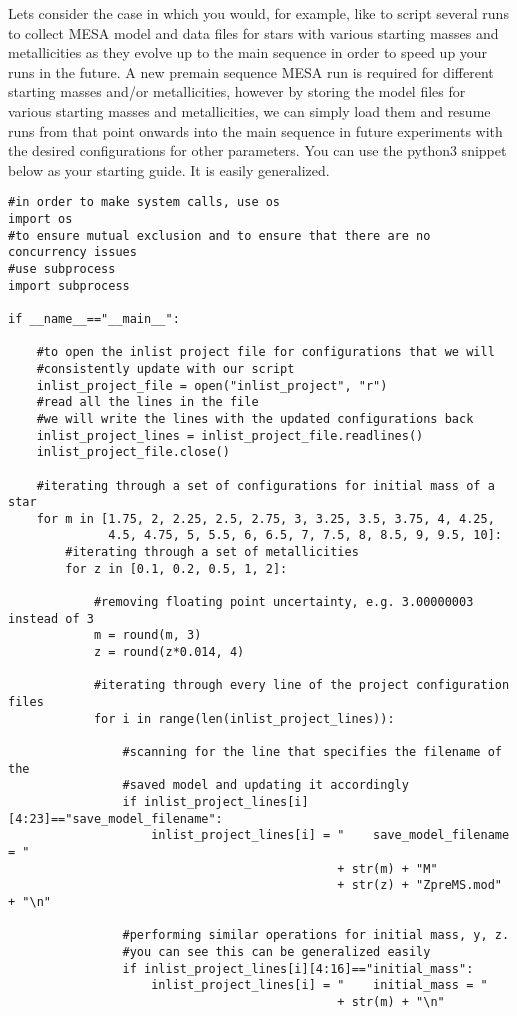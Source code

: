 \documentclass[12pt,hidelinks]{article}
\begin{document}
	    Lets consider the case in which you would, for example, like to script several runs to collect MESA model and data files for stars with various starting masses and metallicities as they evolve up to the main sequence in order to speed up your runs in the future. A new pre\-main sequence MESA run is required for different starting masses and/or metallicities, however by storing the model files for various starting masses and metallicities, we can simply load them and resume runs from that point onwards into the main sequence in future experiments with the desired configurations for other parameters. You can use the python3 snippet below as your starting guide. It is easily generalized.
		\begin{lstlisting}
#in order to make system calls, use os
import os
#to ensure mutual exclusion and to ensure that there are no concurrency issues
#use subprocess
import subprocess

if __name__=="__main__":

    #to open the inlist project file for configurations that we will
    #consistently update with our script
    inlist_project_file = open("inlist_project", "r")
    #read all the lines in the file
    #we will write the lines with the updated configurations back
    inlist_project_lines = inlist_project_file.readlines()
    inlist_project_file.close()

    #iterating through a set of configurations for initial mass of a star
    for m in [1.75, 2, 2.25, 2.5, 2.75, 3, 3.25, 3.5, 3.75, 4, 4.25,
              4.5, 4.75, 5, 5.5, 6, 6.5, 7, 7.5, 8, 8.5, 9, 9.5, 10]:
        #iterating through a set of metallicities
        for z in [0.1, 0.2, 0.5, 1, 2]:

            #removing floating point uncertainty, e.g. 3.00000003 instead of 3
            m = round(m, 3)
            z = round(z*0.014, 4)

            #iterating through every line of the project configuration files
            for i in range(len(inlist_project_lines)):

                #scanning for the line that specifies the filename of the
                #saved model and updating it accordingly
                if inlist_project_lines[i][4:23]=="save_model_filename":
                    inlist_project_lines[i] = "    save_model_filename = "
                                              + str(m) + "M"
                                              + str(z) + "ZpreMS.mod" + "\n"

                #performing similar operations for initial mass, y, z.
                #you can see this can be generalized easily
                if inlist_project_lines[i][4:16]=="initial_mass":
                    inlist_project_lines[i] = "    initial_mass = "
                                              + str(m) + "\n"


\end{lstlisting}
\end{document}
